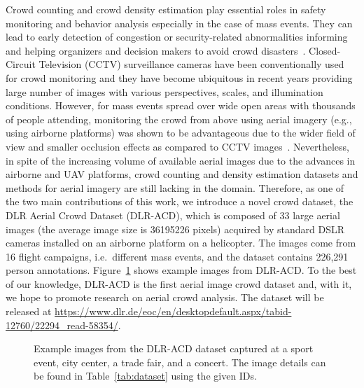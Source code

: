 \documentclass{bmvc2k}
\begin{document}
Crowd counting and crowd density estimation play essential roles in safety monitoring and behavior analysis especially in the case of mass events. They can lead to early detection of congestion or security-related abnormalities informing and helping organizers and decision makers to avoid crowd disasters~\cite{Idrees2018}.
Closed-Circuit Television (CCTV) surveillance cameras have been conventionally used for crowd monitoring and they have become ubiquitous in recent years providing large number of images with various perspectives, scales, and illumination conditions.
However, for mass events spread over wide open areas with thousands of people attending, monitoring the crowd from above using aerial imagery (e.g., using airborne platforms) was shown to be advantageous due to the wider field of view and smaller occlusion effects as compared to CCTV images~\cite{Cui2017}.
Nevertheless, in spite of the increasing volume of available aerial images due to the advances in airborne and UAV platforms, crowd counting and density estimation datasets and methods for aerial imagery are still lacking in the domain.
Therefore, as one of the two main contributions of this work, we introduce a novel crowd dataset, the DLR Aerial Crowd Dataset (DLR-ACD), which is composed of 33 large aerial images (the average image size is 36195226 pixels) acquired by standard DSLR cameras installed on an airborne platform on a helicopter. The images come from 16 flight campaigns, i.e.\ different mass events, and the dataset contains 226,291 person annotations. Figure~\ref{fig:sampleData} shows example images from DLR-ACD. To the best of our knowledge, DLR-ACD is the first aerial image crowd dataset and, with it, we hope to promote research on aerial crowd analysis. The dataset will be released at
{\small{\url{https://www.dlr.de/eoc/en/desktopdefault.aspx/tabid-12760/22294\_read-58354/}}}.
\begin{figure}
    \centering
    \caption{Example images from the DLR-ACD dataset captured at a sport event, city center, a trade fair, and a concert. The image details can be found in Table~\ref{tab:dataset} using the given IDs.} 
    \label{fig:sampleData}
\end{figure}
\end{document}
